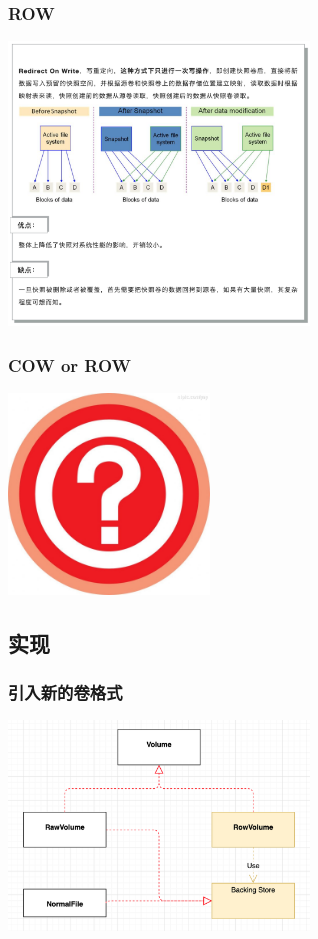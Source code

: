 \documentclass[UTF8,8pt,xcolor=dvipsnames]{beamer}
\begin{document}
\begin{frame}[fragile]
    \frametitle{ROW}
    \begin{center}
        \includegraphics[width=0.6\textwidth]{../imgs/row-snapshot.png}
    \end{center}
\end{frame}

\begin{frame}[fragile]
    \frametitle{COW or ROW}
    \begin{center}
        \includegraphics[width=0.4\textwidth]{../imgs/question-mark.jpg}
    \end{center}
\end{frame}

\subsection{实现}

\begin{frame}[fragile]
    \frametitle{引入新的卷格式}
    \begin{center}
        \includegraphics[width=0.6\textwidth]{../imgs/volume-type.png}
    \end{center}
\end{frame}
\end{document}
